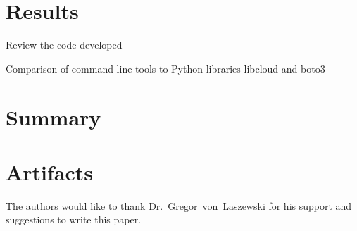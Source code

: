 \section{Results}
Review the code developed


Comparison of command line tools to Python libraries libcloud and boto3

\section{Summary}

\section{Artifacts}

\begin{acks}

  The authors would like to thank Dr.~Gregor~von~Laszewski for his
  support and suggestions to write this paper.

\end{acks}


 

